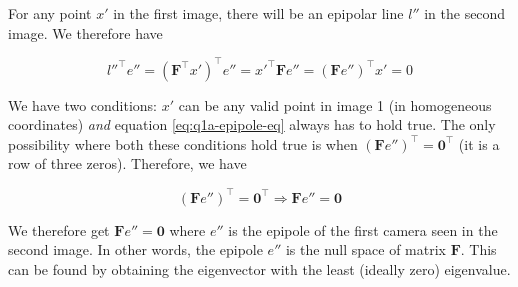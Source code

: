 For any point $x'$ in the first image, there will be an epipolar line $l''$ in the second image. We therefore have

\begin{equation}
    l''^\top e'' = \left ( \mathbf{F}^\top x' \right )^\top e'' = x'^\top \mathbf{F} e'' = \left ( \mathbf{F} e'' \right )^\top x' = 0
    \label{eq:q1a-epipole-eq}
\end{equation}

We have two conditions: $x'$ can be any valid point in image 1 (in homogeneous coordinates) \textit{and} equation \ref{eq:q1a-epipole-eq} always has to hold true. The only possibility where both these conditions hold true is when $\left ( \mathbf{F} e'' \right )^\top = \mathbf{0}^\top$ (it is a row of three zeros). Therefore, we have

\begin{equation}
    \left ( \mathbf{F} e'' \right )^\top = \mathbf{0}^\top
    \Rightarrow
    \mathbf{F} e'' = \mathbf{0}
    \label{eq:q1a-result}
\end{equation}

\noindent
We therefore get $\mathbf{F} e'' = \mathbf{0}$ where $e''$ is the epipole of the first camera seen in the second image. In other words, the epipole $e''$ is the null space of matrix $\mathbf{F}$. This can be found by obtaining the eigenvector with the least (ideally zero) eigenvalue.
